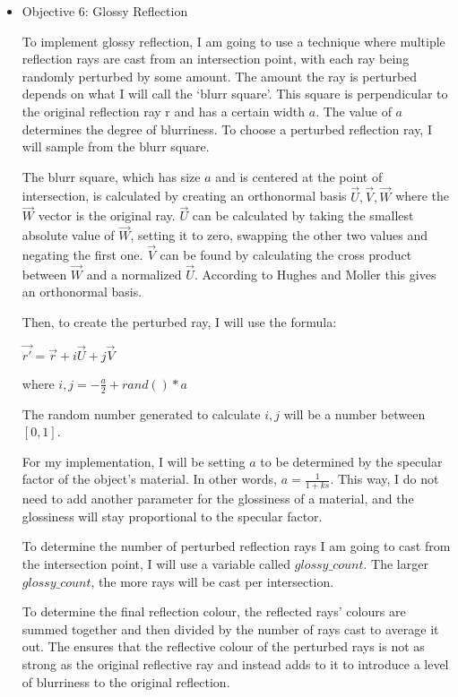 \documentclass {article}
\begin{document}
\begin{description}
\begin{itemize}
    	\item Objective 6: Glossy Reflection \newline
    	
 	To implement glossy reflection, I am going to use a technique where multiple reflection rays are cast from an intersection point, with each ray being randomly perturbed by some amount. The amount the ray is perturbed depends on what I will call the `blurr square'. This square is perpendicular to the original reflection ray r and has a certain width $a$. The value of $a$ determines the degree of blurriness. To choose a perturbed reflection ray, I will sample from the blurr square.
	
	 The blurr square, which has size $a$ and is centered at the point of intersection, is calculated by creating an orthonormal basis ${\vec{U}, \vec{V}, \vec{W}}$ where the $\vec{W}$ vector is the original ray. $\vec{U}$ can be calculated by taking the smallest absolute value of $\vec{W}$, setting it to zero, swapping the other two values and negating the first one. $\vec{V}$ can be found by calculating the cross product between $\vec{W}$ and a normalized $\vec{U}$. According to Hughes and Moller \cite{hughes} this gives an orthonormal basis. \newline
	
	Then, to create the perturbed ray, I will use the formula: \newline
	
	 $\vec{r'} = \vec{r} + i\vec{U} + j\vec{V}$ \newline
	
	 where $ i,j = - \frac{a}{2} + rand()*a$ \newline
	
	 The random number generated to calculate $i,j$ will be a number between $[0,1]$.
	
	 For my implementation, I will be setting $a$ to be determined by the specular factor of the object's material. In other words, $a = \frac{1}{1 + ks}$. This way, I do not need to add another parameter for the glossiness of a material, and the glossiness will stay proportional to the specular factor. \newline
	
	 To determine the number of perturbed reflection rays I am going to cast from the intersection point, I will use a variable called $glossy\_count$. The larger $glossy\_count$, the more rays will be cast per intersection. \newline
	
	 To determine the final reflection colour, the reflected rays' colours are summed together and then divided by the number of rays cast to average it out. The ensures that the reflective colour of the perturbed rays is not as strong as the original reflective ray and instead adds to it to introduce a level of blurriness to the original reflection. \newline
	

\end{itemize}
\end{description}
\end{document}
